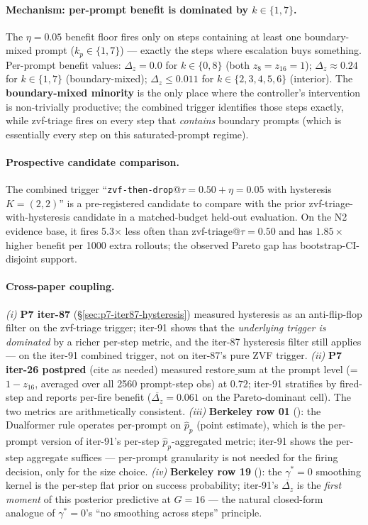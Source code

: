 \paragraph{Mechanism: per-prompt benefit is dominated by $k{\in}\{1,7\}$.}
The $\eta{=}0.05$ benefit floor fires only on steps containing at
least one boundary-mixed prompt ($k_p \in \{1, 7\}$) --- exactly
the steps where escalation buys something. Per-prompt benefit
values: $\Delta_z = 0.0$ for $k\in\{0,8\}$ (both $z_8 = z_{16} = 1$);
$\Delta_z \approx 0.24$ for $k\in\{1,7\}$ (boundary-mixed);
$\Delta_z \le 0.011$ for $k \in \{2, 3, 4, 5, 6\}$ (interior). The
\textbf{boundary-mixed minority} is the only place where the
controller's intervention is non-trivially productive; the
combined trigger identifies those steps exactly, while zvf-triage
fires on every step that \emph{contains} boundary prompts (which
is essentially every step on this saturated-prompt regime).

\paragraph{Prospective candidate comparison.}
The combined trigger ``\texttt{zvf-then-drop}@$\tau{=}0.50{+}\eta{=}0.05$
with hysteresis $K{=}(2,2)$'' is a pre-registered candidate to compare with
the prior zvf-triage-with-hysteresis candidate in a matched-budget held-out
evaluation.  On the N2 evidence base, it fires 5.3$\times$ less often than
zvf-triage@$\tau{=}0.50$ and has $1.85\times$ higher benefit per 1000 extra
rollouts; the observed Pareto gap has bootstrap-CI-disjoint support.

\paragraph{Cross-paper coupling.}
\emph{(i)} \textbf{P7 iter-87} (\S\ref{sec:p7-iter87-hysteresis})
measured hysteresis as an anti-flip-flop filter on the
zvf-triage trigger; iter-91 shows that the \emph{underlying
trigger is dominated} by a richer per-step metric, and the
iter-87 hysteresis filter still applies --- on the iter-91
combined trigger, not on iter-87's pure ZVF trigger. \emph{(ii)}
\textbf{P7 iter-26 postpred} (cite as needed) measured
$\mathrm{restore\_sum}$ at the prompt level (= $1 - z_{16}$,
averaged over all 2560 prompt-step obs) at $0.72$; iter-91
stratifies by fired-step and reports per-fire benefit
($\overline{\Delta_z} = 0.061$ on the Pareto-dominant cell). The
two metrics are arithmetically consistent. \emph{(iii)}
\textbf{Berkeley row 01} (\citet{su2024dualformer}): the
Dualformer rule operates per-prompt on $\hat p_p$ (point
estimate), which is the per-prompt version of iter-91's
per-step $\hat p_p$-aggregated metric; iter-91 shows the
per-step aggregate suffices --- per-prompt granularity is not
needed for the firing decision, only for the size choice.
\emph{(iv)} \textbf{Berkeley row 19}
(\citet{alphaproof2025nature}): the $\gamma^*{=}0$ smoothing
kernel is the per-step flat prior on success probability;
iter-91's $\overline{\Delta_z}$ is the \emph{first moment} of
this posterior predictive at $G{=}16$ --- the natural
closed-form analogue of $\gamma^*{=}0$'s ``no smoothing across
steps'' principle.

